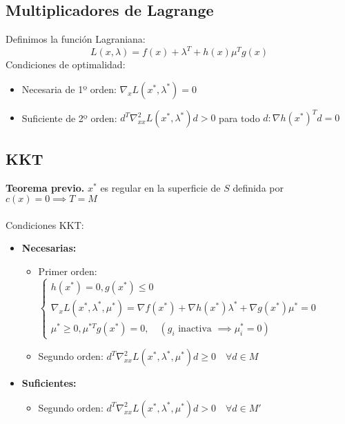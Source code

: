 \documentclass{myclass}
\begin{document}
\subsection{Multiplicadores de Lagrange}
Definimos la función Lagraniana:
\[
L(x, \lambda) = f(x) + \lambda^T + h(x) \mu^Tg(x)
\] 
Condiciones de optimalidad:
\begin{itemize}
  \item Necesaria de 1º orden: $\nabla_xL(x^*, \lambda^*) = 0 $
  \item Suficiente de 2º orden: $d^T\nabla^2_{x x}L(x^*, \lambda^*)d>0$ para todo $d: \nabla h(x^*)^Td = 0$
\end{itemize}

\subsection{KKT}
\textbf{Teorema previo.} $x^*$ es regular en la superficie de $S$ definida por $c(x)=0 \implies T=M$ \\
\\
Condiciones KKT:
\begin{itemize}
  \item \textbf{Necesarias:}
	\begin{itemize}
	  \item Primer orden: $\begin{cases} h(x^*) = 0, g(x^*) \le 0 \\ \nabla_xL(x^*, \lambda^*, \mu^*) = \nabla f(x^*) + \nabla h(x^*)\lambda^* + \nabla g(x^*)\mu^* = 0 \\ \mu^*\geq 0, \mu^{*T}g(x^*) = 0, \quad (g_i \text{ inactiva } \implies \mu^*_i = 0) \end{cases}$
	  \item Segundo orden: $d^T\nabla^2_{x x} L(x^*, \lambda^*, \mu^*)d \geq 0 \quad \forall d \in M$ 
	\end{itemize}
  \item \textbf{Suficientes:}
	\begin{itemize}
	  \item Segundo orden: $d^T\nabla^2_{x x}L(x^*, \lambda^*, \mu^*) d > 0 \quad \forall d\in M'$ 
	\end{itemize}
\end{itemize}
\end{document}
